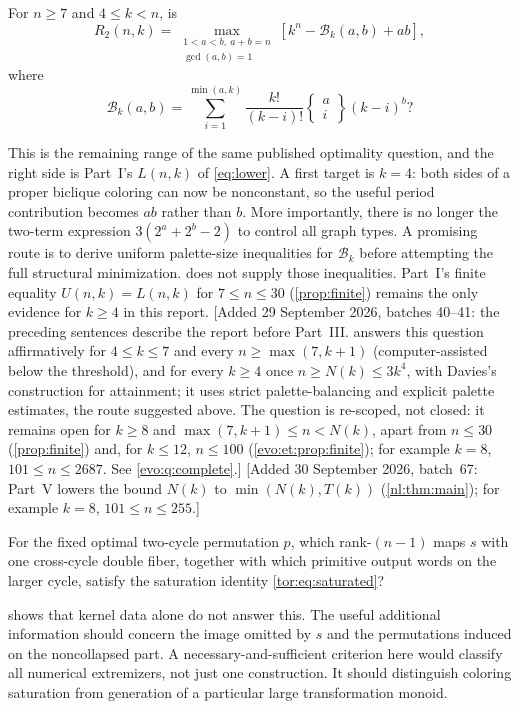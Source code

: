 \documentclass[11pt,a4paper]{article}
\numberwithin{equation}{section}
\theoremstyle{definition}
\theoremstyle{remark}
\newcommand{\stirling}[2]{\left\{\!\begin{matrix}#1\\#2\end{matrix}\!\right\}}
\newcommand{\Bip}{\mathcal B}
\begin{document}
\begin{question}\label{tor:q:four}
For $n\ge7$ and $4\le k<n$, is
\[
 R_2(n,k)=\max_{\substack{1<a<b,\ a+b=n\\\gcd(a,b)=1}}
 \left[k^n-\Bip_k(a,b)+ab\right],
\]
where
\[
 \Bip_k(a,b)=\sum_{i=1}^{\min(a,k)}
 \frac{k!}{(k-i)!}\stirling{a}{i}(k-i)^b?
\]
\end{question}
This is the remaining range of the same published optimality question, and
the right side is Part~I's $L(n,k)$ of \eqref{eq:lower}. A first target is
$k=4$: both sides of a proper biclique coloring can now be nonconstant, so
the useful period contribution becomes $ab$ rather than $b$. More
importantly, there is no longer the two-term expression $3(2^a+2^b-2)$ to
control all graph types. A promising route is to derive uniform palette-size
inequalities for $\Bip_k$ before attempting the full structural minimization.
 does not supply those inequalities. Part~I's finite
equality $U(n,k)=L(n,k)$ for $7\le n\le30$ (\cref{prop:finite}) remains the
only evidence for $k\ge4$ in this report.
[Added 29 September 2026, batches 40--41: the preceding sentences describe the report before
Part~III.  answers this question affirmatively for
$4\le k\le7$ and every $n\ge\max(7,k+1)$ (computer-assisted below the
threshold), and for every $k\ge4$ once $n\ge N(k)\le3k^4$, with Davies's
construction for attainment; it uses strict palette-balancing and explicit
palette estimates, the route suggested above. The question is re-scoped, not
closed: it remains open for $k\ge8$ and $\max(7,k+1)\le n<N(k)$, apart from
$n\le30$ (\cref{prop:finite}) and, for $k\le12$, $n\le100$
(\cref{evo:et:prop:finite}); for example $k=8$, $101\le n\le2687$. See
\cref{evo:q:complete}.]
[Added 30 September 2026, batch~67: Part~V lowers the bound $N(k)$ to $\min(N(k),T(k))$
(\cref{nl:thm:main}); for example $k=8$, $101\le n\le255$.]

\begin{question}\label{tor:q:singular}
For the fixed optimal two-cycle permutation $p$, which rank-$(n-1)$ maps $s$
with one cross-cycle double fiber, together with which primitive output words
on the larger cycle, satisfy the saturation identity
\eqref{tor:eq:saturated}?
\end{question}
 shows that kernel data alone do not answer this.
The useful additional information should concern the image omitted by $s$ and
the permutations induced on the noncollapsed part. A necessary-and-sufficient
criterion here would classify all numerical extremizers, not just one
construction. It should distinguish coloring saturation from generation of a
particular large transformation monoid.
\end{document}
